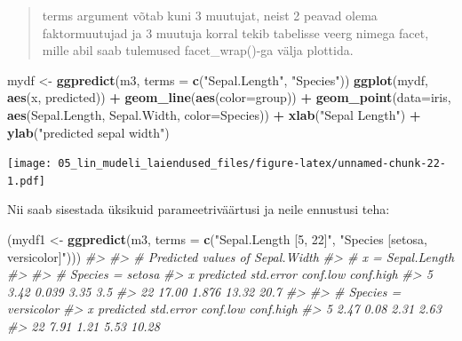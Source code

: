 \documentclass[]{book}
\newenvironment{Shaded}{\begin{snugshade}}{\end{snugshade}}
\newcommand{\KeywordTok}[1]{\textcolor[rgb]{0.13,0.29,0.53}{\textbf{#1}}}
\newcommand{\DataTypeTok}[1]{\textcolor[rgb]{0.13,0.29,0.53}{#1}}
\newcommand{\StringTok}[1]{\textcolor[rgb]{0.31,0.60,0.02}{#1}}
\newcommand{\CommentTok}[1]{\textcolor[rgb]{0.56,0.35,0.01}{\textit{#1}}}
\newcommand{\OperatorTok}[1]{\textcolor[rgb]{0.81,0.36,0.00}{\textbf{#1}}}
\newcommand{\NormalTok}[1]{#1}
\begin{document}
\begin{quote}
terms argument võtab kuni 3 muutujat, neist 2 peavad olema
faktormuutujad ja 3 muutuja korral tekib tabelisse veerg nimega facet,
mille abil saab tulemused facet\_wrap()-ga välja plottida.
\end{quote}

\begin{Shaded}
\begin{Highlighting}[]
\NormalTok{mydf <-}\StringTok{ }\KeywordTok{ggpredict}\NormalTok{(m3, }\DataTypeTok{terms =} \KeywordTok{c}\NormalTok{(}\StringTok{"Sepal.Length"}\NormalTok{, }\StringTok{"Species"}\NormalTok{))}
\KeywordTok{ggplot}\NormalTok{(mydf, }\KeywordTok{aes}\NormalTok{(x, predicted)) }\OperatorTok{+}\StringTok{ }
\StringTok{  }\KeywordTok{geom_line}\NormalTok{(}\KeywordTok{aes}\NormalTok{(}\DataTypeTok{color=}\NormalTok{group)) }\OperatorTok{+}\StringTok{ }
\StringTok{  }\KeywordTok{geom_point}\NormalTok{(}\DataTypeTok{data=}\NormalTok{iris, }\KeywordTok{aes}\NormalTok{(Sepal.Length, Sepal.Width, }\DataTypeTok{color=}\NormalTok{Species)) }\OperatorTok{+}\StringTok{ }
\StringTok{  }\KeywordTok{xlab}\NormalTok{(}\StringTok{"Sepal Length"}\NormalTok{) }\OperatorTok{+}
\StringTok{  }\KeywordTok{ylab}\NormalTok{(}\StringTok{"predicted sepal width"}\NormalTok{)}
\end{Highlighting}
\end{Shaded}

\texttt{[image: 05\_lin\_mudeli\_laiendused\_files/figure-latex/unnamed-chunk-22-1.pdf]}

Nii saab sisestada üksikuid parameetriväärtusi ja neile ennustusi teha:

\begin{Shaded}
\begin{Highlighting}[]
\NormalTok{(mydf1 <-}\StringTok{ }\KeywordTok{ggpredict}\NormalTok{(m3, }\DataTypeTok{terms =} \KeywordTok{c}\NormalTok{(}\StringTok{"Sepal.Length [5, 22]"}\NormalTok{, }\StringTok{"Species [setosa, versicolor]"}\NormalTok{)))}
\CommentTok{#> }
\CommentTok{#> # Predicted values of Sepal.Width}
\CommentTok{#> # x = Sepal.Length}
\CommentTok{#> }
\CommentTok{#> # Species = setosa}
\CommentTok{#>   x predicted std.error conf.low conf.high}
\CommentTok{#>   5      3.42     0.039     3.35       3.5}
\CommentTok{#>  22     17.00     1.876    13.32      20.7}
\CommentTok{#> }
\CommentTok{#> # Species = versicolor}
\CommentTok{#>   x predicted std.error conf.low conf.high}
\CommentTok{#>   5      2.47      0.08     2.31      2.63}
\CommentTok{#>  22      7.91      1.21     5.53     10.28}
\end{Highlighting}
\end{Shaded}
\end{document}
